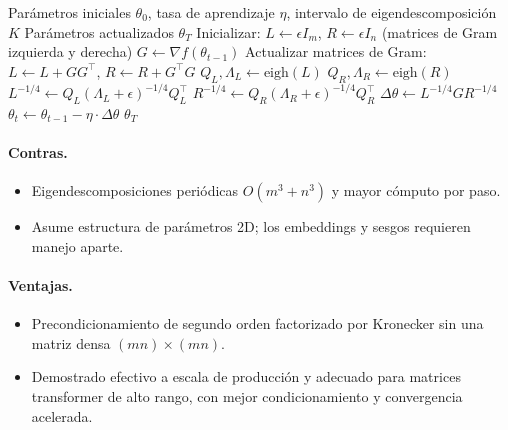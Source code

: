 \begin{algorithm}[H]
\caption{Shampoo (Precondicionamiento Matricial mediante Productos de Kronecker)}
\label{alg:shampoo}
\begin{algorithmic}[1]
\Require Parámetros iniciales $\theta_0$, tasa de aprendizaje $\eta$, intervalo de eigendescomposición $K$
\Ensure Parámetros actualizados $\theta_T$
\State Inicializar: $L \gets \epsilon I_m$, $R \gets \epsilon I_n$ (matrices de Gram izquierda y derecha)
    \State $G \gets \nabla f(\theta_{t-1})$ 
    \State Actualizar matrices de Gram: $L \gets L + G G^\top$, $R \gets R + G^\top G$
        \State $Q_L, \Lambda_L \gets \text{eigh}(L)$ 
        \State $Q_R, \Lambda_R \gets \text{eigh}(R)$ 
        \State $L^{-1/4} \gets Q_L (\Lambda_L + \epsilon)^{-1/4} Q_L^\top$
        \State $R^{-1/4} \gets Q_R (\Lambda_R + \epsilon)^{-1/4} Q_R^\top$
    \EndIf
    \State $\Delta \theta \gets L^{-1/4} G R^{-1/4}$ 
    \State $\theta_t \gets \theta_{t-1} - \eta \cdot \Delta \theta$
\EndFor
\Return $\theta_T$
\end{algorithmic}
\end{algorithm}

\paragraph{Contras.}
\begin{itemize}[leftmargin=*]
\item Eigendescomposiciones periódicas $O(m^3+n^3)$ y mayor cómputo por paso.
\item Asume estructura de parámetros 2D; los embeddings y sesgos requieren manejo aparte.
\end{itemize}

\paragraph{Ventajas.}
\begin{itemize}[leftmargin=*]
\item Precondicionamiento de segundo orden factorizado por Kronecker sin una matriz densa $(mn)\times(mn)$.
\item Demostrado efectivo a escala de producción y adecuado para matrices transformer de alto rango, con mejor condicionamiento y convergencia acelerada.
\end{itemize}

